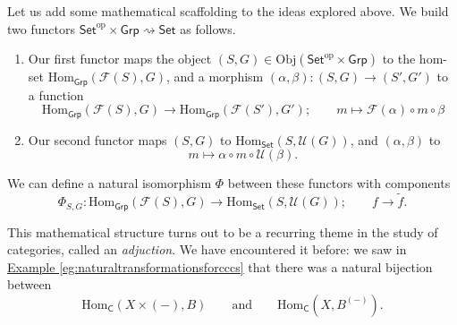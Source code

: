 \documentclass[a4paper,10pt]{scrreprt}
\newcommand{\Obj}{\mathrm{Obj}}
\newcommand{\Hom}{\mathrm{Hom}}
\theoremstyle{definition}
\theoremstyle{plain}
\theoremstyle{remark}
\begin{document}
Let us add some mathematical scaffolding to the ideas explored above. We build two functors $\mathsf{Set}^{\mathrm{op}} \times \mathsf{Grp} \rightsquigarrow \mathsf{Set}$ as follows.
\begin{enumerate}
  \item Our first functor maps the object $(S, G) \in \Obj(\mathsf{Set}^{\mathrm{op}} \times \mathsf{Grp})$ to the hom-set $\Hom_{\mathsf{Grp}}(\mathcal{F}(S), G)$, and a morphism $(\alpha, \beta)\colon (S,G) \to (S', G')$ to a function 
    \begin{equation*}
      \Hom_{\mathsf{Grp}}(\mathcal{F}(S), G) \to \Hom_{\mathsf{Grp}}(\mathcal{F}(S'), G');\qquad m \mapsto \mathcal{F}(\alpha) \circ m \circ \beta
    \end{equation*}

  \item Our second functor maps $(S, G)$ to $\Hom_{\mathsf{Set}}(S, \mathcal{U}(G))$, and $(\alpha, \beta)$ to 
    \begin{equation*}
      m \mapsto \alpha \circ m \circ \mathcal{U}(\beta).
    \end{equation*}
\end{enumerate}
We can define a natural isomorphism $\Phi$ between these functors with components
\begin{equation*}
  \Phi_{S, G}\colon \Hom_{\mathsf{Grp}}(\mathcal{F}(S), G) \to \Hom_{\mathsf{Set}}(S, \mathcal{U}(G));\qquad f \to \tilde{f}.
\end{equation*}

This mathematical structure turns out to be a recurring theme in the study of categories, called an \emph{adjuction}. We have encountered it before: we saw in \hyperref[eg:naturaltransformationsforcccs]{Example \ref*{eg:naturaltransformationsforcccs}} that there was a natural bijection between 
\begin{equation*}
  \Hom_{\mathsf{C}}(X \times (-), B)\qquad\text{and}\qquad \Hom_{\mathsf{C}}(X, B^{(-)}).
\end{equation*}
\end{document}
